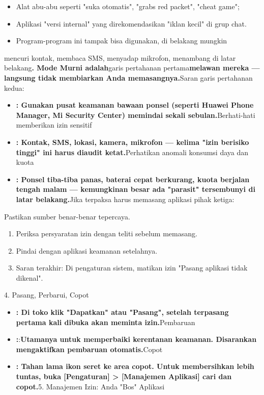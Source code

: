 \begin{itemize}
  \item Alat abu-abu seperti "suka otomatis", "grabs red packet", "cheat game";
  \item Aplikasi "versi internal" yang direkomendasikan "iklan kecil" di grup chat.
  \item Program-program ini tampak bisa digunakan, di belakang mungkin
\end{itemize}

mencuri kontak, membaca SMS, menyadap mikrofon, menambang di latar belakang\textbf{. Mode Murni adalah}garis pertahanan pertama\textbf{melawan mereka — langsung tidak membiarkan Anda memasangnya.}Saran garis pertahanan kedua:


\begin{itemize}
  \item \textbf{: Gunakan pusat keamanan bawaan ponsel (seperti Huawei Phone Manager, Mi Security Center) memindai sekali sebulan.}Berhati-hati memberikan izin sensitif
  \item \textbf{: Kontak, SMS, lokasi, kamera, mikrofon — kelima "izin berisiko tinggi" ini harus diaudit ketat.}Perhatikan anomali konsumsi daya dan kuota
  \item \textbf{: Ponsel tiba-tiba panas, baterai cepat berkurang, kuota berjalan tengah malam — kemungkinan besar ada "parasit" tersembunyi di latar belakang.}Jika terpaksa harus memasang aplikasi pihak ketiga:
\end{itemize}

Pastikan sumber benar-benar tepercaya.

\begin{enumerate}
  \item Periksa persyaratan izin dengan teliti sebelum memasang.
  \item Pindai dengan aplikasi keamanan setelahnya.
  \item Saran terakhir: Di pengaturan sistem, matikan izin "Pasang aplikasi tidak dikenal".
\end{enumerate}

4. Pasang, Perbarui, Copot


\begin{itemize}
  \item \textbf{: Di toko klik "Dapatkan" atau "Pasang", setelah terpasang pertama kali dibuka akan meminta izin.}Pembaruan
  \item \textbf{:}:\textbf{Utamanya untuk memperbaiki kerentanan keamanan. Disarankan mengaktifkan pembaruan otomatis.}Copot
  \item \textbf{: Tahan lama ikon seret ke area copot. Untuk membersihkan lebih tuntas, buka [Pengaturan] > [Manajemen Aplikasi] cari dan copot.}5. Manajemen Izin: Anda "Bos" Aplikasi
\end{itemize}

